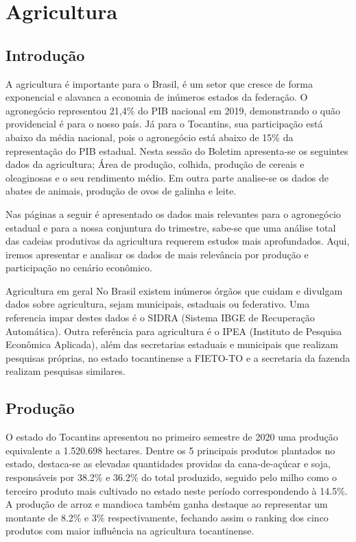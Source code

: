 \chapter{Agricultura}
\section{Introdução}
\par A agricultura é importante para o Brasil, é um setor que cresce de forma exponencial e alavanca a economia de inúmeros estados da federação. O agronegócio representou 21,4\% do PIB nacional em 2019, demonstrando o quão providencial é para o nosso país. Já para o Tocantins, sua participação está abaixo da média nacional, pois o agronegócio está abaixo de 15\% da representação do PIB estadual. Nesta sessão do Boletim apresenta-se os seguintes dados da agricultura; Área de produção, colhida, produção de cereais e oleaginosas e o seu rendimento médio. Em outra parte analise-se os dados de abates de animais, produção de ovos de galinha e leite. 
\par Nas páginas a seguir é apresentado os dados mais relevantes para o agronegócio estadual e para a nossa conjuntura do trimestre, sabe-se que uma análise total das cadeias produtivas da agricultura requerem estudos mais aprofundados. Aqui, iremos apresentar e analisar os dados de mais relevância por produção e participação no cenário econômico.

\begin{smbox}[label={labelbox},nameref={Agricultura}]{Agricultura em geral}
No Brasil existem inúmeros órgãos que cuidam e divulgam dados sobre agricultura, sejam municipais, estaduais ou federativo. Uma referencia impar destes dados é o SIDRA (Sistema IBGE de Recuperação Automática). Outra referência para agricultura é o IPEA (Instituto de Pesquisa Econômica Aplicada), além das secretarias estaduais e municipais que realizam pesquisas próprias, no estado tocantinense a FIETO-TO e a secretaria da fazenda realizam pesquisas similares.
\end{smbox}

\section{Produção}
\par O estado do Tocantins apresentou no primeiro semestre de 2020 uma produção  equivalente a 1.520.698 hectares. Dentre os 5 principais produtos plantados no estado, destaca-se as elevadas quantidades providas da cana-de-açúcar e soja, responsáveis por 38.2\% e 36.2\% do total produzido, seguido pelo milho como o terceiro produto mais cultivado no estado neste período correspondendo à 14.5\%. A produção de arroz e mandioca também ganha destaque ao representar um montante de 8.2\% e 3\% respectivamente, fechando assim o ranking dos cinco produtos com maior influência na agricultura tocantinense. 

